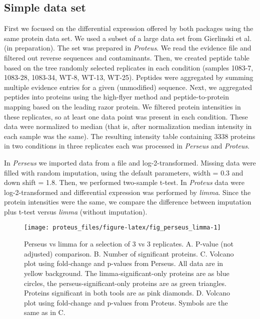 \documentclass[]{article}
\begin{document}
\subsection{Simple data set}\label{simple-data-set}

First we focused on the differential expression offered by both packages
using the same protein data set. We used a subset of a large data set
from Gierlinski et al. (in preparation). The set was prepared in
\emph{Proteus}. We read the evidence file and filtered out reverse
sequences and contaminants. Then, we created peptide table based on the
tree randomly selected replicates in each condition (samples 1083-7,
1083-28, 1083-34, WT-8, WT-13, WT-25). Peptides were aggregated by
summing multiple evidence entries for a given (unmodified) sequence.
Next, we aggregated peptides into proteins using the high-flyer method
and peptide-to-protein mapping based on the leading razor protein. We
filtered protein intensities in these replicates, so at least one data
point was present in each condition. These data were normalized to
median (that is, after normalization median intensity in each sample was
the same). The resulting intensity table containing 3338 proteins in two
conditions in three replicates each was processed in \emph{Perseus} and
\emph{Proteus}.

In \emph{Perseus} we imported data from a file and log-2-transformed.
Missing data were filled with random imputation, using the default
parameters, width = 0.3 and down shift = 1.8. Then, we performed
two-sample t-test. In \emph{Proteus} data were log-2-transformed and
differential expression was performed by \emph{limma}. Since the protein
intensities were the same, we compare the difference between imputation
plus t-test versus \emph{limma} (without imputation).

\begin{figure}[H]

{\centering \texttt{[image: proteus\_files/figure-latex/fig\_perseus\_limma-1]} 

}

\caption{\label{fig:perseus_limma}Perseus vs limma for a selection of 3 vs 3 replicates. A. P-value (not adjusted) comparison. B. Number of significant proteins. C. Volcano plot using fold-change and p-values from Perseus. All data are in yellow background. The limma-significant-only proteins are as blue circles, the perseus-significant-only proteins are as green triangles. Proteins significant in both tools are as pink diamonds. D. Volcano plot using fold-change and p-values from Proteus. Symbols are the same as in C.}\label{fig:fig_perseus_limma}
\end{figure}
\end{document}
